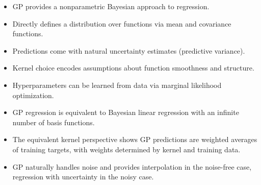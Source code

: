 \begin{itemize}
    \item GP provides a nonparametric Bayesian approach to regression.
    \item Directly defines a distribution over functions via mean and covariance functions.
    \item Predictions come with natural uncertainty estimates (predictive variance).
    \item Kernel choice encodes assumptions about function smoothness and structure.
    \item Hyperparameters can be learned from data via marginal likelihood optimization.
    \item GP regression is equivalent to Bayesian linear regression with an infinite number of basis functions.
    \item The equivalent kernel perspective shows GP predictions are weighted averages of training targets, with weights determined by kernel and training data.
    \item GP naturally handles noise and provides interpolation in the noise-free case, regression with uncertainty in the noisy case.
\end{itemize}

